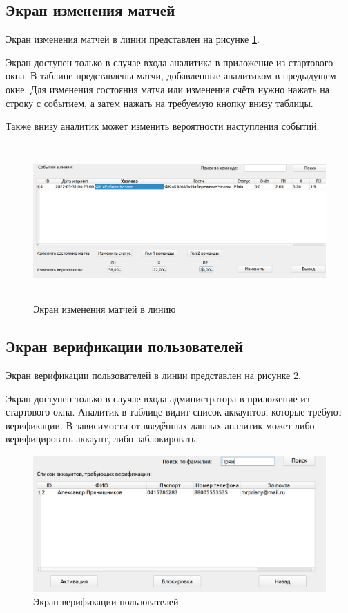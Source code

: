 \subsection{Экран изменения матчей}
Экран изменения матчей в линии представлен на рисунке \ref{fig::change}.

Экран доступен только в случае входа аналитика в приложение из стартового окна.
В таблице представлены матчи, добавленные аналитиком в предыдущем окне.
Для изменения состояния матча или изменения счёта нужно нажать на строку с событием, а затем нажать на требуемую кнопку внизу таблицы.

Также внизу аналитик может изменить вероятности наступления событий.

\FloatBarrier
\begin{figure}[h]	
	\begin{center}
		\includegraphics[height=6cm, width=\linewidth]{inc/matches.png}
	\end{center}
	\caption{Экран изменения матчей в линию}
	\label{fig::change}
\end{figure}
\FloatBarrier

\subsection{Экран верификации пользователей}
Экран верификации пользователей в линии представлен на рисунке \ref{fig::verify}.

Экран доступен только в случае входа администратора в приложение из стартового окна.
Аналитик в таблице видит список аккаунтов, которые требуют верификации.
В зависимости от введённых данных аналитик может либо верифицировать аккаунт, либо заблокировать.

\FloatBarrier
\begin{figure}[h]	
	\begin{center}
		\includegraphics[width=\linewidth]{inc/verify.png}
	\end{center}
	\caption{Экран верификации пользователей}
	\label{fig::verify}
\end{figure}
\FloatBarrier